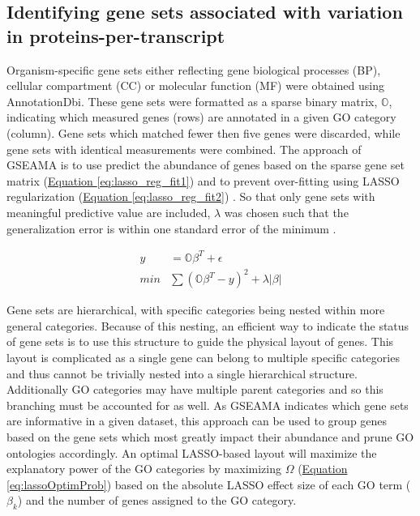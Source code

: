 \subsection{Identifying gene sets associated with variation in proteins-per-transcript}

Organism-specific gene sets either reflecting gene biological processes (BP), cellular compartment (CC) or molecular function (MF) were obtained using AnnotationDbi\cite{Pages:2008us}. These gene sets were formatted as a sparse binary matrix, $\mathbb{O}$, indicating which measured genes (rows) are annotated in a given GO category (column). Gene sets which matched fewer then five genes were discarded, while gene sets with identical measurements were combined. The approach of GSEAMA is to use predict the abundance of genes based on the sparse gene set matrix (\hyperref[eq:lasso_reg_fit1]{Equation \ref{eq:lasso_reg_fit1}}) and to prevent over-fitting using LASSO regularization (\hyperref[eq:lasso_reg_fit2]{Equation \ref{eq:lasso_reg_fit2}}) \cite{Tibshirani:1996wb}. So that only gene sets with meaningful predictive value are included, $\lambda$ was chosen such that the generalization error is within one standard error of the minimum \cite{Friedman:2009ub}.

\begin{subequations}
\begin{align}
y &= \mathbb{O}\beta^{T} + \epsilon\label{eq:lasso_reg_fit1}\\
min &\sum\left(\mathbb{O}\beta^{T} - y\right)^{2} + \lambda |\beta |\label{eq:lasso_reg_fit2}
\end{align}
\end{subequations}

Gene sets are hierarchical, with specific categories being nested within more general categories. Because of this nesting, an efficient way to indicate the status of gene sets is to use this structure to guide the physical layout of genes. This layout is complicated as a single gene can belong to multiple specific categories and thus cannot be trivially nested into a single hierarchical structure. Additionally GO categories may have multiple parent categories and so this branching must be accounted for as well. As GSEAMA indicates which gene sets are informative in a given dataset, this approach can be used to group genes based on the gene sets which most greatly impact their abundance and prune GO ontologies accordingly. An optimal LASSO-based layout will maximize the explanatory power of the GO categories by maximizing $\Omega$ (\hyperref[eq:lassoOptimProb]{Equation \ref{eq:lassoOptimProb}}) based on the absolute LASSO effect size of each GO term ($\beta_{k}$) and the number of genes assigned to the GO category.

